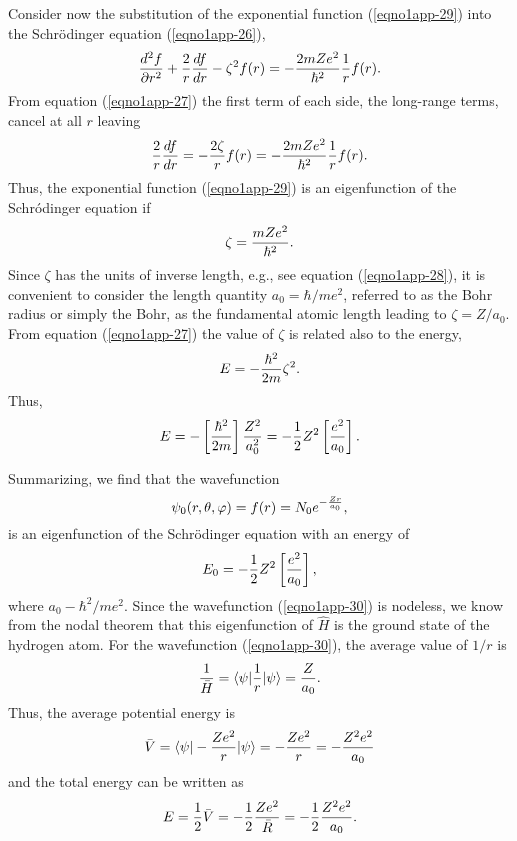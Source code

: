 Consider now the substitution of the exponential function
(\ref{eqno1app-29}) into the Schr\"odinger equation (\ref{eqno1app-26}),
\begin{equation}
{d^2 f \over \partial r^2} + {2 \over r} {df \over dr} - \zeta^2 f(r) 
= - {2mZe^2 \over \hbar^2} {1 \over r} f(r).
\end{equation}
From equation (\ref{eqno1app-27}) the first term of each side, the
long-range terms, cancel at all $r$ leaving
\begin{equation}
{2 \over r} {df \over dr} = - {2 \zeta \over r} f(r) = - {2mZe^2 
\over \hbar^2} {1 \over r} f(r).
\end{equation}
Thus, the exponential function (\ref{eqno1app-29}) is an eigenfunction of the Schr\'odinger
equation if
\begin{equation}
\zeta = {mZe^2 \over \hbar^2}.
\end{equation}
Since $\zeta$ has the units of inverse length, e.g., see equation
(\ref{eqno1app-28}), it is convenient to consider the length quantity
$a_0 = \hbar / me^2$, referred to as the Bohr radius or simply the
Bohr, as the fundamental atomic length leading to $\zeta = Z/a_0$.
From equation (\ref{eqno1app-27}) the value of $\zeta$ is related also
to the energy,
\begin{equation}
E = - {\hbar^2 \over 2m} \zeta^2.
\end{equation}
Thus,
\begin{equation}
E = - \left[ {\hbar^2 \over 2m} \right] {Z^2 \over a^2_0} = - {1 \over 
2} Z^2 \left[ {e^2 \over a_0} \right].
\end{equation}

Summarizing, we find that the wavefunction
\begin{equation}
\psi_0 ( r , \theta , \varphi ) = f ( r ) = N_0 e^{-{Zr \over 
a_0}},
\label{eqno1app-30}
\end{equation}
is an eigenfunction of the Schr\"odinger equation with an energy of
\begin{equation}
E_0 = - {1 \over 2} Z^2 \left[ {e^2 \over a_0} \right],
\end{equation}
where $a_0 - \hbar^2 / m e^2$.  Since the wavefunction
(\ref{eqno1app-30}) is nodeless, we know from the nodal theorem that
this eigenfunction of ${\hat H}$ is the ground state of the hydrogen
atom. For the wavefunction (\ref{eqno1app-30}), the average value of
$1/r$ is
\begin{equation}
{1 \over {\bar H}} = \langle \psi \vert {1 \over r} \vert \psi 
\rangle = {Z \over a_0}.
\end{equation}
Thus, the average potential energy is
\begin{equation}
{\bar V} = \langle \psi \vert - {Ze^2 \over r} \vert \psi \rangle = - 
{Ze^2 \over r} = - {Z^2e^2 \over a_0}
\end{equation}
and the total energy can be written as
\begin{equation}
E = {1 \over 2} {\bar V} = - {1 \over 2} {Ze^2 \over {\bar R}} = - {1 
\over 2} {Z^2e^2 \over a_0}.
\end{equation}

